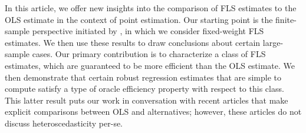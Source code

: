 \documentclass[12pt]{article}
\begin{document}
{In this article, we offer new insights into the comparison of FLS estimates to the OLS estimate in the context of point estimation. Our starting point is the finite-sample perspective initiated by \cite{szroeter_exact_1994}, in which we consider fixed-weight FLS estimates. We then use these results to draw conclusions about certain large-sample cases. Our primary contribution is to characterize a class of FLS estimates, which are guaranteed to be more efficient than the OLS estimate. We then demonstrate that certain robust regression estimates that are simple to compute satisfy a type of oracle efficiency property with respect to this class. This latter result puts our work in conversation with recent articles \citep{feng_optimal_2024, wiens_ignore_2024} that make explicit comparisons between OLS and alternatives; however, these articles do not discuss heteroscedasticity per-se.}
\end{document}
